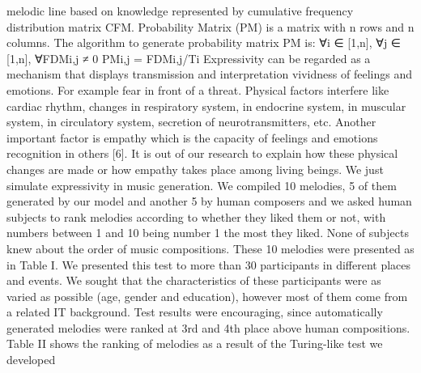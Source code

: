 melodic line based on knowledge represented by cumulative frequency distribution matrix CFM. Probability Matrix (PM) is a matrix with n rows and n columns. The algorithm to generate probability matrix PM is: ∀i ∈ [1,n], ∀j ∈ [1,n], ∀FDMi,j ≠ 0 PMi,j = FDMi,j/Ti  Expressivity can be regarded as a mechanism that displays transmission and interpretation vividness of feelings and emotions. For example fear in front of a threat. Physical factors interfere like cardiac rhythm, changes in respiratory system, in endocrine system, in muscular system, in circulatory system, secretion of neurotransmitters, etc. Another important factor is empathy which is the capacity of feelings and emotions recognition in others [6]. It is out of our research to explain how these physical changes are made or how empathy takes place among living beings. We just simulate expressivity in music generation. We compiled 10 melodies, 5 of them generated by our model and another 5 by human composers and we asked human subjects to rank melodies according to whether they liked them or not, with numbers between 1 and 10 being number 1 the most they liked. None of subjects knew about the order of music compositions. These 10 melodies were presented as in Table I. We presented this test to more than 30 participants in different places and events. We sought that the characteristics of these participants were as varied as possible (age, gender and education), however most of them come from a related IT background. Test results were encouraging, since automatically generated melodies were ranked at 3rd and 4th place above human compositions. Table II shows the ranking of melodies as a result of the Turing-like test we developed

